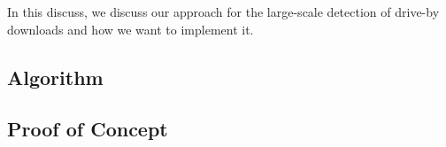 In this discuss, we discuss our approach for the large-scale detection of drive-by downloads and how we want to implement it.

\subsection{Algorithm}


\subsection{Proof of Concept}

